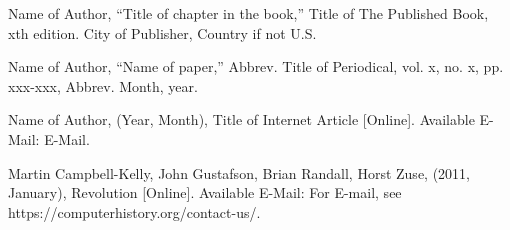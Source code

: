 \documentclass[letterpaper, 10 pt, conference]{IEEEconf}
\begin{document}
\begin{enumerate}[label={[\arabic*]}]
\item Name of Author, ``Title of chapter in the book,''
Title of The Published Book, xth edition. City of
Publisher, Country if not U.S.
\item Name of Author, “Name of paper,” Abbrev.
Title of Periodical, vol. x, no. x, pp. xxx-xxx,
Abbrev. Month, year.
\item Name of Author, (Year, Month),
Title of Internet Article [Online]. Available E-Mail:
E-Mail.
\item Martin Campbell-Kelly, John Gustafson, 
Brian Randall, Horst Zuse, (2011, January),
Revolution [Online]. Available E-Mail:
For E-mail, see https://computerhistory.org/contact-us/.
\end{enumerate}
\end{document}
